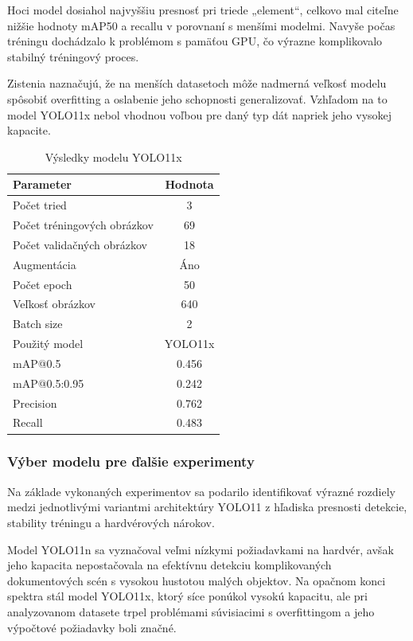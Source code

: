             Hoci model dosiahol najvyššiu presnosť pri triede „element“, celkovo mal citeľne nižšie hodnoty mAP50 a recallu v porovnaní s menšími modelmi. Navyše počas tréningu dochádzalo k problémom s pamäťou GPU, čo výrazne komplikovalo stabilný tréningový proces.

            Zistenia naznačujú, že na menších datasetoch môže nadmerná veľkosť modelu spôsobiť overfitting a oslabenie jeho schopnosti generalizovať. Vzhľadom na to model YOLO11x nebol vhodnou voľbou pre daný typ dát napriek jeho vysokej kapacite.
            \begin{table}[H]
                \centering
                \begin{tabular}{|l|c|}
                \hline
                \textbf{Parameter} & \textbf{Hodnota} \\ \hline
                Počet tried & 3 \\ \hline
                Počet tréningových obrázkov & 69 \\ \hline
                Počet validačných obrázkov & 18 \\ \hline
                Augmentácia & Áno \\ \hline
                Počet epoch & 50 \\ \hline
                Veľkosť obrázkov & 640 \\ \hline
                Batch size & 2 \\ \hline
                Použitý model & YOLO11x \\ \hline
                mAP@0.5 & 0.456 \\ \hline
                mAP@0.5:0.95 & 0.242 \\ \hline
                Precision & 0.762 \\ \hline
                Recall & 0.483 \\ \hline
                \end{tabular}
                \caption{Výsledky modelu YOLO11x}
                \label{tab:yolo11x}
            \end{table}
            \subsubsection{Výber modelu pre ďalšie experimenty}
            Na základe vykonaných experimentov sa podarilo identifikovať výrazné rozdiely medzi jednotlivými variantmi architektúry YOLO11 z hľadiska presnosti detekcie, stability tréningu a hardvérových nárokov.

            Model YOLO11n sa vyznačoval veľmi nízkymi požiadavkami na hardvér, avšak jeho kapacita nepostačovala na efektívnu detekciu komplikovaných dokumentových scén s vysokou hustotou malých objektov. Na opačnom konci spektra stál model YOLO11x, ktorý síce ponúkol vysokú kapacitu, ale pri analyzovanom datasete trpel problémami súvisiacimi s overfittingom a jeho výpočtové požiadavky boli značné.

